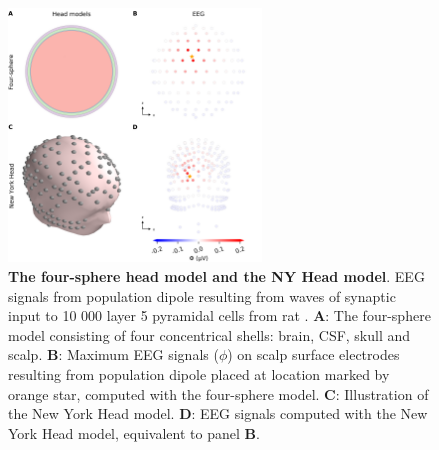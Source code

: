 \documentclass[preprint,11pt,authoryear]{elsarticle}
\newcommand{\hlj}[2][OliveGreen]{ {\sethlcolor{#1} \hl{#2}} }
\newcommand{\hlR}[2][red]{ {\sethlcolor{#1} \hl{#2}} }
\newcommand{\gen}[1]{\color{white}{\hlR{GTE: #1 }}\color{black}}
\newcommand{\tvnnote}[1]{\color{white}{\hlj{TVN: #1 }}\color{black}}
\begin{document}
\begin{figure}[!ht]
\begin{center}
\includegraphics[width=0.6\textwidth]{fig_head_models.png}
\end{center}
\caption{\textbf{The four-sphere head model and the NY Head model}. EEG signals from population dipole resulting from waves of synaptic input to 10 000 layer 5 pyramidal cells from rat \citep{Hay2011}.
	{\bf A}: The four-sphere model consisting of four concentrical shells: brain, CSF, skull and scalp. 
	{\bf B}: Maximum EEG signals ($\phi$) on scalp surface electrodes resulting from population dipole placed at location marked by orange star, computed with the four-sphere model.
	{\bf C}: Illustration of the New York Head model.
	{\bf D}: EEG signals computed with the New York Head model, equivalent to panel {\bf B}.
}
\label{fig:head_models}
\end{figure}


%



\end{document}
